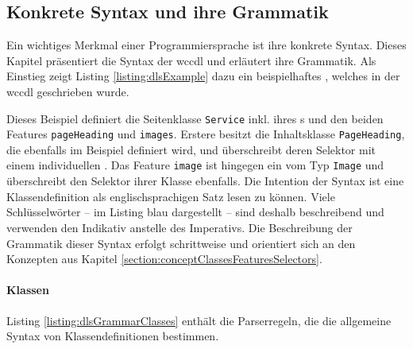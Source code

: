 \subsection{Konkrete Syntax und ihre Grammatik}
    Ein wichtiges Merkmal einer Programmiersprache ist ihre konkrete Syntax.
    Dieses Kapitel präsentiert die Syntax der \gls{wccdl} und erläutert ihre Grammatik.    
    Als Einstieg zeigt Listing \ref{listing:dlsExample}
    dazu ein beispielhaftes {\classificationModel},
    welches in der \gls{wccdl} geschrieben wurde.

    

    Dieses Beispiel definiert die Seitenklasse \texttt{Service} inkl.
    ihres {\urlSelector}s und den beiden Features \texttt{pageHeading} und \texttt{images}.
    Erstere besitzt die Inhaltsklasse \texttt{PageHeading}, die ebenfalls im Beispiel definiert wird,
    und überschreibt deren Selektor mit einem individuellen {\cssSelector}.
    Das Feature \texttt{image} ist hingegen ein {} vom Typ
    \texttt{Image} und überschreibt den Selektor ihrer Klasse ebenfalls.
    Die Intention der Syntax ist eine Klassendefinition
    als englischsprachigen Satz lesen zu können.
    Viele Schlüsselwörter -- im Listing blau dargestellt --
    sind deshalb beschreibend und verwenden
    den Indikativ anstelle des Imperativs.  
    Die Beschreibung der Grammatik dieser Syntax erfolgt schrittweise
    und orientiert sich an den Konzepten aus Kapitel \ref{section:conceptClassesFeaturesSelectors}.
    
    \paragraph{Klassen}
    Listing \ref{listing:dlsGrammarClasses} enthält die Parserregeln,
    die die allgemeine Syntax von Klassendefinitionen bestimmen.

    

